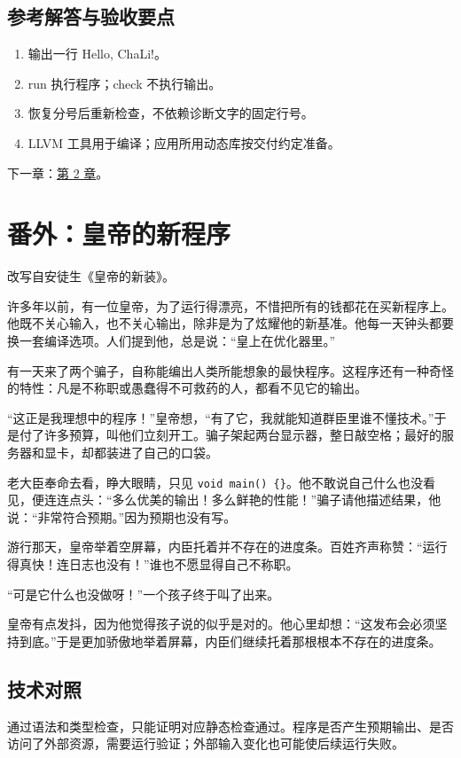 \subsection*{参考解答与验收要点}

\begin{enumerate}

\item 输出一行 Hello, ChaLi!。

\item run 执行程序；check 不执行输出。

\item 恢复分号后重新检查，不依赖诊断文字的固定行号。

\item LLVM 工具用于编译；应用所用动态库按交付约定准备。

\end{enumerate}

下一章：\hyperref[ch:02]{第 2 章}。

\section{番外：皇帝的新程序}

改写自安徒生《皇帝的新装》。

许多年以前，有一位皇帝，为了运行得漂亮，不惜把所有的钱都花在买新程序上。他既不关心输入，也不关心输出，除非是为了炫耀他的新基准。他每一天钟头都要换一套编译选项。人们提到他，总是说：“皇上在优化器里。”

有一天来了两个骗子，自称能编出人类所能想象的最快程序。这程序还有一种奇怪的特性：凡是不称职或愚蠢得不可救药的人，都看不见它的输出。

“这正是我理想中的程序！”皇帝想，“有了它，我就能知道群臣里谁不懂技术。”于是付了许多预算，叫他们立刻开工。骗子架起两台显示器，整日敲空格；最好的服务器和显卡，却都装进了自己的口袋。

老大臣奉命去看，睁大眼睛，只见 \texttt{void main(\allowbreak{})\allowbreak{} \{\}}。他不敢说自己什么也没看见，便连连点头：“多么优美的输出！多么鲜艳的性能！”骗子请他描述结果，他说：“非常符合预期。”因为预期也没有写。

游行那天，皇帝举着空屏幕，内臣托着并不存在的进度条。百姓齐声称赞：“运行得真快！连日志也没有！”谁也不愿显得自己不称职。

“可是它什么也没做呀！”一个孩子终于叫了出来。

皇帝有点发抖，因为他觉得孩子说的似乎是对的。他心里却想：“这发布会必须坚持到底。”于是更加骄傲地举着屏幕，内臣们继续托着那根根本不存在的进度条。

\subsection*{技术对照}

通过语法和类型检查，只能证明对应静态检查通过。程序是否产生预期输出、是否访问了外部资源，需要运行验证；外部输入变化也可能使后续运行失败。
